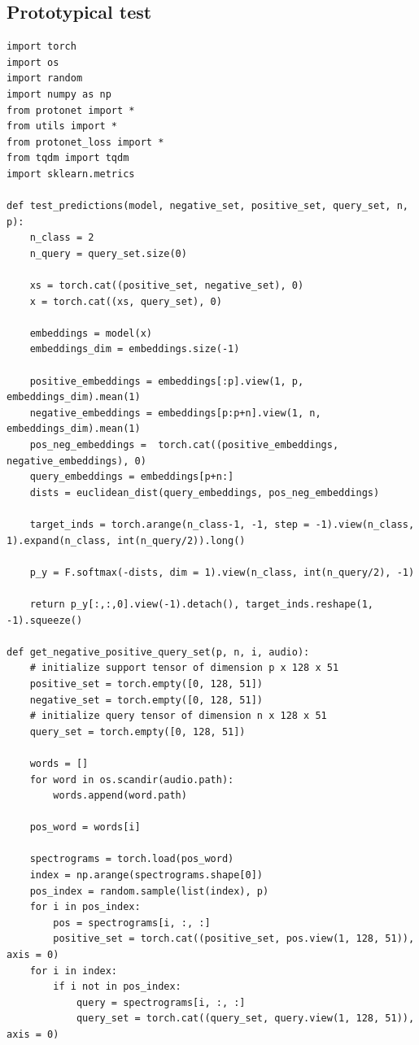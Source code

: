 \documentclass[12pt,a4paper,titlepage]{article}
\begin{document}
\subsection{Prototypical test}
\begin{lstlisting}[language=iPython,firstnumber=1, caption=protonet\_test.py, label=protonet test,captionpos=b]
import torch
import os
import random
import numpy as np
from protonet import *
from utils import *
from protonet_loss import *
from tqdm import tqdm
import sklearn.metrics

def test_predictions(model, negative_set, positive_set, query_set, n, p):
    n_class = 2
    n_query = query_set.size(0)
    
    xs = torch.cat((positive_set, negative_set), 0)   
    x = torch.cat((xs, query_set), 0)
    
    embeddings = model(x)
    embeddings_dim = embeddings.size(-1)
    
    positive_embeddings = embeddings[:p].view(1, p, embeddings_dim).mean(1)    
    negative_embeddings = embeddings[p:p+n].view(1, n, embeddings_dim).mean(1)     
    pos_neg_embeddings =  torch.cat((positive_embeddings, negative_embeddings), 0)
    query_embeddings = embeddings[p+n:]
    dists = euclidean_dist(query_embeddings, pos_neg_embeddings)

    target_inds = torch.arange(n_class-1, -1, step = -1).view(n_class, 1).expand(n_class, int(n_query/2)).long()

    p_y = F.softmax(-dists, dim = 1).view(n_class, int(n_query/2), -1)

    return p_y[:,:,0].view(-1).detach(), target_inds.reshape(1, -1).squeeze()

def get_negative_positive_query_set(p, n, i, audio):
    # initialize support tensor of dimension p x 128 x 51
    positive_set = torch.empty([0, 128, 51])
    negative_set = torch.empty([0, 128, 51])
    # initialize query tensor of dimension n x 128 x 51
    query_set = torch.empty([0, 128, 51])
    
    words = []
    for word in os.scandir(audio.path):
        words.append(word.path)
        
    pos_word = words[i]

    spectrograms = torch.load(pos_word)
    index = np.arange(spectrograms.shape[0])
    pos_index = random.sample(list(index), p)
    for i in pos_index:
        pos = spectrograms[i, :, :]
        positive_set = torch.cat((positive_set, pos.view(1, 128, 51)), axis = 0)
    for i in index:
        if i not in pos_index:
            query = spectrograms[i, :, :]
            query_set = torch.cat((query_set, query.view(1, 128, 51)), axis = 0)


\end{lstlisting}
\end{document}
